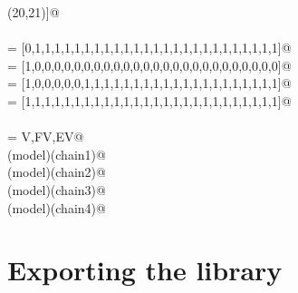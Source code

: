 \documentclass[11pt,oneside]{article}    %
\begin{document}
\begin{flushleft}
\begin{list}{}{}
\mbox{}\verb@(20,21)]@\\
\mbox{}\verb@@\\
\mbox{} = [0,1,1,1,1,1,1,1,1,1,1,1,1,1,1,1,1,1,1,1,1,1,1,1,1,1]@\\
\mbox{} = [1,0,0,0,0,0,0,0,0,0,0,0,0,0,0,0,0,0,0,0,0,0,0,0,0,0]@\\
\mbox{} = [1,0,0,0,0,0,1,1,1,1,1,1,1,1,1,1,1,1,1,1,1,1,1,1,1,1]@\\
\mbox{} = [1,1,1,1,1,1,1,1,1,1,1,1,1,1,1,1,1,1,1,1,1,1,1,1,1,1]@\\
\mbox{}\verb@@\\
\mbox{}\verb@model = V,FV,EV@\\
\mbox{}\verb@viewLarComplexChain(model)(chain1)@\\
\mbox{}\verb@viewLarComplexChain(model)(chain2)@\\
\mbox{}\verb@viewLarComplexChain(model)(chain3)@\\
\mbox{}\verb@viewLarComplexChain(model)(chain4)@\\
\mbox{}\verb@@{\NWsep}
\end{list}
\vspace{-2ex}
\end{flushleft}


\section{Exporting the library}
\end{document}
